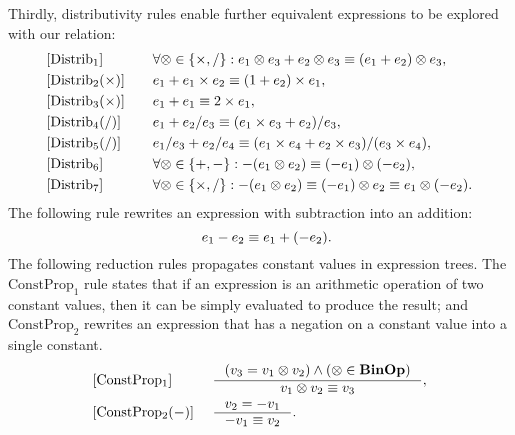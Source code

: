 Thirdly, distributivity rules enable further equivalent expressions to be
explored with our relation:
\begin{equation}
    \begin{aligned}{}
        & [\mathrm{Distrib}_1] & \quad &
            \forall \otimes \in \{ \times, / \}:
            e_1 \otimes e_3 + e_2 \otimes e_3
            \equiv (e_1 + e_2) \otimes e_3, \\
        & [\mathrm{Distrib}_2 (\times)] & \quad &
            e_1 + e_1 \times e_2 \equiv (1 + e_2) \times e_1, \\
        & [\mathrm{Distrib}_3 (\times)] & \quad &
            e_1 + e_1 \equiv 2 \times e_1, \\
        & [\mathrm{Distrib}_4 (/)] & \quad &
            e_1 + e_2 / e_3 \equiv (e_1 \times e_3 + e_2) / e_3, \\
        & [\mathrm{Distrib}_5 (/)] & \quad &
            e_1 / e_3 + e_2 / e_4 \equiv
            (e_1 \times e_4 + e_2 \times e_3) / (e_3 \times e_4), \\
        & [\mathrm{Distrib}_6] & \quad &
            \forall \otimes \in \{ +, - \}:
            -(e_1 \otimes e_2) \equiv (-e_1) \otimes (-e_2), \\
        & [\mathrm{Distrib}_7] & \quad &
            \forall \otimes \in \{ \times, / \}:
            -(e_1 \otimes e_2)
            \equiv (-e_1) \otimes e_2 \equiv e_1 \otimes (-e_2).
    \end{aligned}
\end{equation}
The following rule rewrites an expression with subtraction into an addition:
\begin{equation}
    [\mathrm{Subtract}] \quad
    e_1 - e_2 \eqrel e_1 + (-e_2).
\end{equation}
The following reduction rules propagates constant values in expression
trees. The $\mathrm{ConstProp}_1$ rule states that if an expression is an
arithmetic operation of two constant values, then it can be simply evaluated to
produce the result; and $\mathrm{ConstProp}_2$ rewrites an expression that has
a negation on a constant value into a single constant.
\begin{equation}
    \begin{aligned}{}
        & [\mathrm{ConstProp_1}] &~&
        \inference{%
            (v_3 = v_1 \opsymbol v_2) \wedge
            (\opsymbol \in \binopset)
        }{%
            v_1 \opsymbol v_2 \eqrel v_3
        }, \\
        & [\mathrm{ConstProp_2} (-)] &~&
        \inference{%
            v_2 = -v_1
        }{%
            -v_1 \eqrel v_2
        }.
    \end{aligned}
    \label{so:eq:constant_propagation}
\end{equation}
